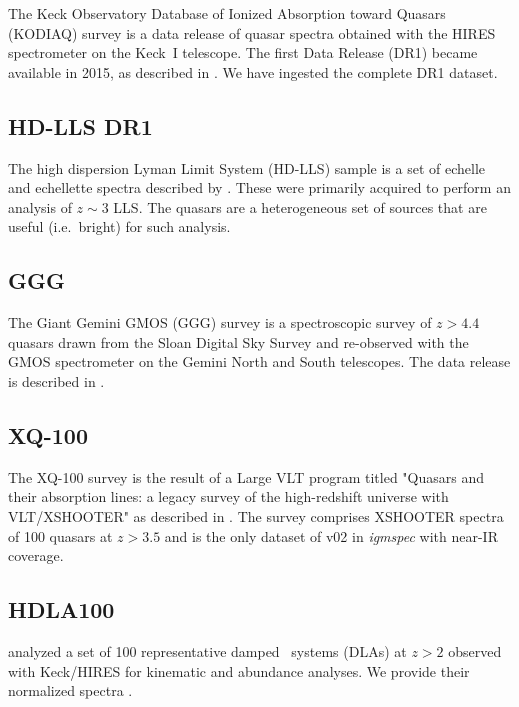 \documentclass[12pt]{elsarticle}
\begin{document}
The Keck Observatory Database of Ionized Absorption toward Quasars (KODIAQ) survey is a data release of quasar spectra
obtained with the HIRES spectrometer 
\citep{vogt94} on the Keck~I telescope. 
The first Data Release (DR1) became available in 2015, 
as described in \cite{kodiaq_dr1}. 
We have ingested the complete DR1 dataset.

\subsection{HD-LLS DR1}
\label{sec:hdlls}

The high dispersion Lyman Limit System (HD-LLS) sample is a set of echelle and echellette spectra described by \cite{prochaska+15}.  
These were primarily acquired
to perform an analysis of $z \sim 3$ LLS. 
The quasars are a heterogeneous set of sources that
are useful  (i.e.\ bright) for such analysis. 

\subsection{GGG}
\label{sec:ggg}

The Giant Gemini GMOS (GGG) survey is a spectroscopic survey of 
$z>4.4$ quasars drawn from the Sloan Digital Sky Survey and re-observed with the GMOS spectrometer on the Gemini North and South telescopes. 
The data release is described in \cite{worseck+14}.

\subsection{XQ-100}
\label{sec:xq100}

The XQ-100 survey is the result of a Large VLT program
titled "Quasars and their absorption lines: 
a legacy survey of the high-redshift universe with VLT/XSHOOTER" 
as described in \cite{xq100}.
The survey comprises XSHOOTER spectra of 100 quasars 
at $z>3.5$ and is the only dataset of v02 in {\it igmspec}
with near-IR coverage.

\subsection{HDLA100}
\label{sec:hdla100}

\cite{marcel13} analyzed a set of 100 representative
damped \lya\ systems
(DLAs) at $z>2$
observed with Keck/HIRES for kinematic and abundance
analyses.  We provide their normalized spectra
\citep[see also][]{pwh+07}.
\end{document}
